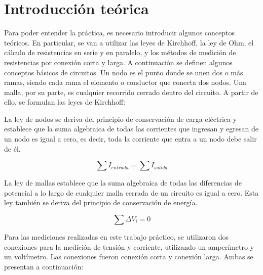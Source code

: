 \section{Introducción teórica}

Para poder entender la práctica, es necesario introducir algunos conceptos teóricos. En particular, se van a utilizar las leyes de Kirchhoff, la ley de Ohm, el cálculo de resistencias en serie y en paralelo, y los métodos de medición de resistencias por conexión corta y larga.
A continuación se definen algunos conceptos básicos de circuitos. Un nodo es el punto donde se unen dos o más ramas, siendo cada rama el elemento o conductor que conecta dos nodos. Una malla, por su parte, es cualquier recorrido cerrado dentro del circuito. A partir de ello, se formulan las leyes de Kirchhoff:

La ley de nodos se deriva del principio de conservación de carga eléctrica y establece que la suma algebraica de todas las corrientes que ingresan y egresan de un nodo es igual a cero, es decir, toda la corriente que entra a un nodo debe salir de él.

\begin{equation}
    \sum I_{entrada}=\sum I_{salida}
    \label{Ley Nodos}
\end{equation}

La ley de mallas establece que la suma algebraica de todas las diferencias de potencial a lo largo de cualquier malla cerrada de un circuito es igual a cero. Esta ley también se deriva del principio de conservación de energía.

\begin{equation}
    \sum \Delta V_i=0
    \label{Ley Mallas}
\end{equation}


Para las mediciones realizadas en este trabajo práctico, se utilizaron dos conexiones para la medición de tensión y corriente, utilizando un amperímetro y un voltímetro. Las conexiones fueron conexión corta y conexión larga. Ambas se presentan a continuación:

